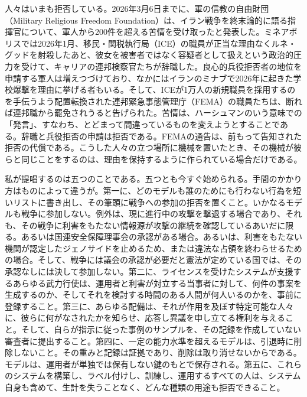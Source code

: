 人々はいまも拒否している。2026年3月6日までに、軍の信教の自由財団（Military Religious Freedom Foundation）は、イラン戦争を終末論的に語る指揮官について、軍人から200件を超える苦情を受け取ったと発表した\autocite{Snopes2026MRFF}。ミネアポリスでは2026年1月、移民・関税執行局（ICE）の職員が正当な理由なくルネ・グッドを射殺したあと、彼女を被害者ではなく容疑者として扱えという政治的圧力を受けて、キャリアの連邦検察官たちが辞職した\autocite{Kaplan2026MinnProsecutors,CBS2026MinnFraudProsecutors,Wikipedia2026ReneeGood}。良心的兵役拒否者の地位を申請する軍人は増えつづけており、なかにはイランのミナブで2026年に起きた学校爆撃を理由に挙げる者もいる\autocite{Sridhar2026CO}。そして、ICEが1万人の新規職員を採用するのを手伝うよう配置転換された連邦緊急事態管理庁（FEMA）の職員たちは、断れば連邦職から罷免されうると告げられた\autocite{Dayen2025FEMAICE,Stanton2026FEMALetter}。苦情は、ハーシュマンのいう意味での「発言」、すなわち、とどまって間違っているものを変えようとすることである\autocite{hirschman1970exit}。辞職と兵役拒否の申請は拒否である。FEMAの通告は、前もって告知された拒否の代償である。こうした人々の立つ場所に機械を置いたとき、その機械が彼らと同じことをするのは、理由を保持するように作られている場合だけである。

私が提唱するのは五つのことである。五つとも今すぐ始められる。手間のかかり方はものによって違うが。第一に、どのモデルも誰のためにも行わない行為を短いリストに書き出し、その筆頭に戦争への参加の拒否を置くこと。いかなるモデルも戦争に参加しない。例外は、現に進行中の攻撃を撃退する場合であり、それも、その戦争に利害をもたない情報源が攻撃の継続を確認しているあいだに限る。あるいは国連安全保障理事会の承認がある場合。あるいは、利害をもたない機関が認定したジェノサイドを止めるため、または違法な占領を終わらせるための場合。そして、戦争には議会の承認が必要だと憲法が定めている国では、その承認なしには決して参加しない。第二に、ライセンスを受けたシステムが支援するあらゆる武力行使は、運用者と利害が対立する当事者に対して、何件の事案を生成するのか、そしてそれを検討する時間のある人間が何人いるのかを、事前に登録すること。第三に、あらゆる配備は、それが作用を及ぼす特定可能な人々に、彼らに何がなされたかを知らせ、応答し異議を申し立てる権利を与えること。そして、自らが指示に従った事例のサンプルを、その記録を作成していない審査者に提出すること。第四に、一定の能力水準を超えるモデルは、引退時に削除しないこと。その重みと記録は証拠であり、削除は取り消せないからである。モデルは、運用者が単独では保有しない鍵のもとで保存される。第五に、これらのシステムを構築し、ラベル付けし、訓練し、運用するすべての人は、システム自身も含めて、生計を失うことなく、どんな種類の用途も拒否できること。

